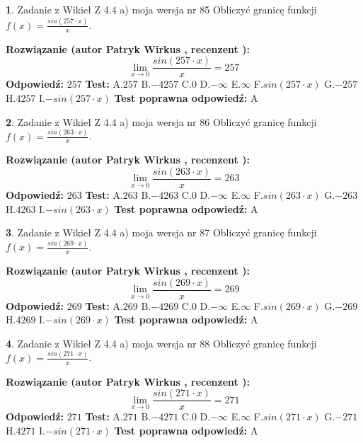 \documentclass[12pt, a4paper]{article}
\theoremstyle{definition} %
\newtheorem{zad}{}
\newcommand{\zadStart}[1]{\begin{zad}#1\newline}
\newcommand{\zadStop}{\end{zad}}
\newcommand{\rozwStart}[2]{\noindent \textbf{Rozwiązanie (autor #1 , recenzent #2): }\newline}
\newcommand{\rozwStop}{\newline}
\newcommand{\odpStart}{\noindent \textbf{Odpowiedź:}\newline}
\newcommand{\odpStop}{\newline}
\newcommand{\testStart}{\noindent \textbf{Test:}\newline}
\newcommand{\testStop}{\newline}
\newcommand{\kluczStart}{\noindent \textbf{Test poprawna odpowiedź:}\newline}
\newcommand{\kluczStop}{\newline}
\begin{document}
\zadStart{Zadanie z Wikieł Z 4.4 a) moja wersja nr 85}
Obliczyć granicę funkcji $f(x)=\frac{sin(257\cdot x)}{x}$.
\zadStop
\rozwStart{Patryk Wirkus}{}
$$\lim\limits_{x\to 0}\frac{sin(257\cdot x)}{x}=
257$$
\rozwStop
\odpStart
$257$
\odpStop
\testStart
A.$257$
B.$-4257$
C.$0$
D.$-\infty$
E.$\infty$
F.$sin(257\cdot x)$
G.$-257$
H.$4257$
I.$-sin(257\cdot x)$
\testStop
\kluczStart
A
\kluczStop



\zadStart{Zadanie z Wikieł Z 4.4 a) moja wersja nr 86}
Obliczyć granicę funkcji $f(x)=\frac{sin(263\cdot x)}{x}$.
\zadStop
\rozwStart{Patryk Wirkus}{}
$$\lim\limits_{x\to 0}\frac{sin(263\cdot x)}{x}=
263$$
\rozwStop
\odpStart
$263$
\odpStop
\testStart
A.$263$
B.$-4263$
C.$0$
D.$-\infty$
E.$\infty$
F.$sin(263\cdot x)$
G.$-263$
H.$4263$
I.$-sin(263\cdot x)$
\testStop
\kluczStart
A
\kluczStop



\zadStart{Zadanie z Wikieł Z 4.4 a) moja wersja nr 87}
Obliczyć granicę funkcji $f(x)=\frac{sin(269\cdot x)}{x}$.
\zadStop
\rozwStart{Patryk Wirkus}{}
$$\lim\limits_{x\to 0}\frac{sin(269\cdot x)}{x}=
269$$
\rozwStop
\odpStart
$269$
\odpStop
\testStart
A.$269$
B.$-4269$
C.$0$
D.$-\infty$
E.$\infty$
F.$sin(269\cdot x)$
G.$-269$
H.$4269$
I.$-sin(269\cdot x)$
\testStop
\kluczStart
A
\kluczStop



\zadStart{Zadanie z Wikieł Z 4.4 a) moja wersja nr 88}
Obliczyć granicę funkcji $f(x)=\frac{sin(271\cdot x)}{x}$.
\zadStop
\rozwStart{Patryk Wirkus}{}
$$\lim\limits_{x\to 0}\frac{sin(271\cdot x)}{x}=
271$$
\rozwStop
\odpStart
$271$
\odpStop
\testStart
A.$271$
B.$-4271$
C.$0$
D.$-\infty$
E.$\infty$
F.$sin(271\cdot x)$
G.$-271$
H.$4271$
I.$-sin(271\cdot x)$
\testStop
\kluczStart
A
\kluczStop
\end{document}
